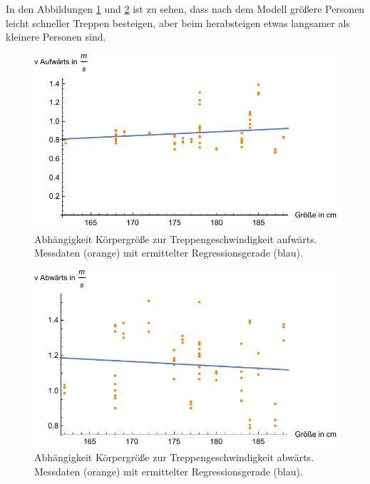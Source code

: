In den Abbildungen \ref{fig:auf2017-groesse} und \ref{fig:ab2017-groesse} ist 
zu sehen, dass nach dem Modell größere Personen leicht schneller Treppen besteigen, aber beim herabsteigen etwas langsamer als kleinere
Personen sind. 

\begin{figure} \centering 
	\includegraphics[]{abbildungen/regression/2017/auf-groesse.pdf}
	
	\caption{Abhängigkeit Körpergröße zur Treppengeschwindigkeit aufwärts. Messdaten (orange) mit ermittelter Regressionsgerade (blau). \label{fig:auf2017-groesse}}
\end{figure}

\begin{figure} \centering 
	\includegraphics[]{abbildungen/regression/2017/ab-groesse.pdf}
	
	\caption{Abhängigkeit Körpergröße zur Treppengeschwindigkeit abwärts. Messdaten (orange) mit ermittelter Regressionsgerade (blau). \label{fig:ab2017-groesse}}
\end{figure}

